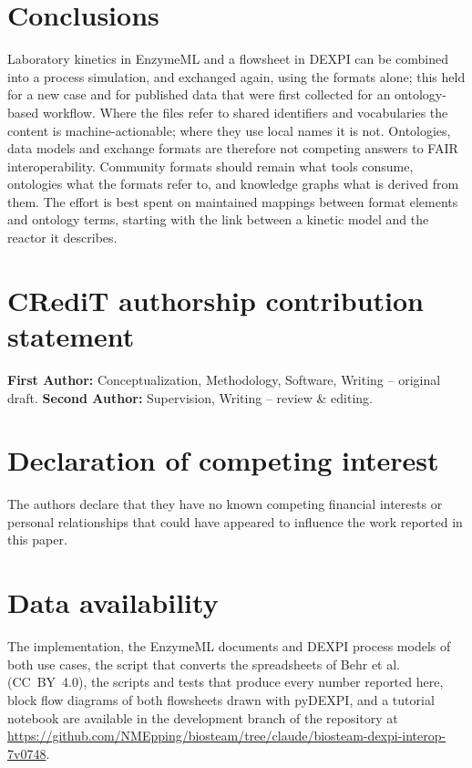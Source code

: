 \documentclass[preprint,12pt]{elsarticle}
\begin{document}
\section{Conclusions}

Laboratory kinetics in EnzymeML and a flowsheet in DEXPI can be combined
into a process simulation, and exchanged again, using the formats alone;
this held for a new case and for published data that were first collected
for an ontology-based workflow. Where the files refer to shared
identifiers and vocabularies the content is machine-actionable; where they
use local names it is not. Ontologies, data models and exchange formats
are therefore not competing answers to FAIR interoperability. Community
formats should remain what tools consume, ontologies what the formats
refer to, and knowledge graphs what is derived from them. The effort is
best spent on maintained mappings between format elements and ontology
terms, starting with the link between a kinetic model and the reactor it
describes.

\section*{CRediT authorship contribution statement}
\textbf{First Author:} Conceptualization, Methodology, Software, Writing --
original draft. \textbf{Second Author:} Supervision, Writing -- review \&
editing.

\section*{Declaration of competing interest}
The authors declare that they have no known competing financial interests
or personal relationships that could have appeared to influence the work
reported in this paper.

\section*{Data availability}
The implementation, the EnzymeML documents and DEXPI process models of
both use cases, the script that converts the spreadsheets of Behr et
al.~\cite{behr2024data} (CC~BY~4.0), the scripts and tests that produce
every number reported here, block flow diagrams of both flowsheets
drawn with pyDEXPI, and a tutorial notebook are available in the development branch of the repository at
\url{https://github.com/NMEpping/biosteam/tree/claude/biosteam-dexpi-interop-7v0748}.
\end{document}
